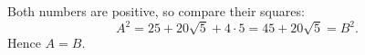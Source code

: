 Both numbers are positive, so compare their squares:
\[
A^2=25+20\sqrt5+4\cdot5=45+20\sqrt5=B^2 .
\]
Hence $\boxed{A=B}$.
